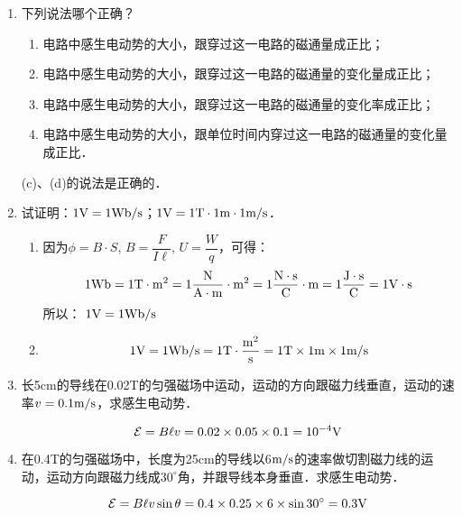 \begin{enumerate}
    \item 下列说法哪个正确？
    \begin{enumerate}
        \item 电路中感生电动势的大小，跟穿过这一电路的磁通量成正比；
        \item 电路中感生电动势的大小，跟穿过这一电路的磁通量的变化量成正比；
        \item 电路中感生电动势的大小，跟穿过这一电路的磁通量的变化率成正比；
        \item 电路中感生电动势的大小，跟单位时间内穿过这一电路的磁通量的变化量成正比．
    \end{enumerate}

    \begin{solution}
    (c)、(d)的说法是正确的．
    \end{solution}
    
\item 试证明：$1{\rm V}=1{\rm Wb}/{\rm s}$；$1{\rm V}=1{\rm T}\cdot 1{\rm m}\cdot 1\text{m}/\text{s}$．

\begin{solution}
\begin{enumerate}
    \item  因为$\phi=B\cdot S$, $B=\dfrac{F}{I\ell}$, $U=\dfrac{W}{q}$，可得：
   \[ 1{\rm Wb}=1{\rm T\cdot m^2}=1\frac{{\rm N}}{{\rm A\cdot m}}\cdot {\rm m^2}=1\frac{{\rm N\cdot s}}{{\rm C}}\cdot {\rm m}=1\frac{\rm J\cdot s}{\rm C}=1{\rm V\cdot s}\]
    所以： $1{\rm V}=1{\rm Wb}/{\rm s}$
    \item  \[1{\rm V}=1{\rm Wb/s}=1{\rm T}\cdot \frac{\rm m^2}{\rm s}=1{\rm T}\times 1{\rm m}\times 1\text{m}/\text{s}\]
\end{enumerate}
\end{solution}

\item  长5cm的导线在0.02T的匀强磁场中运动，运动的方向跟磁力线垂直，运动的速率$v=0.1\text{m}/\text{s}$，求感生电动势．

\begin{solution}
\[\mathcal{E}=B\ell v=0.02\times 0.05\times 0.1=10^{-4}{\rm V}\]
\end{solution}

\item 在0.4T的匀强磁场中，长度为25cm的导线以6$\text{m}/\text{s}$的速率做切割磁力线的运动，运动方向跟磁力线成$30^{\circ}$角，并跟导线本身垂直．求感生电动势．

\begin{solution}
    \[\mathcal{E}=B\ell v\sin\theta=0.4\times 0.25\times 6\times \sin 30^{\circ}=0.3{\rm V}\]
\end{solution}


\end{enumerate}
